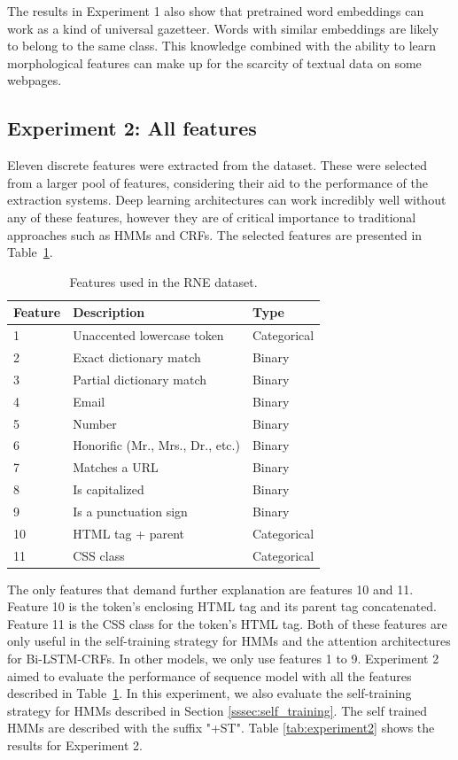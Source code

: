 \documentclass{nle}
\begin{document}
The results in Experiment 1 also show that pretrained word embeddings can work 
as a kind of universal gazetteer. Words with similar embeddings are likely to 
belong to the same class. This knowledge combined with the ability to learn 
morphological features can make up for the scarcity of textual data on some 
webpages.

\subsection{Experiment 2: All features}

Eleven discrete features were extracted from the dataset. 
These were selected from a larger pool of features, 
considering their aid to the performance of the extraction systems. Deep learning 
architectures can work incredibly well without any of these features, however they
are of critical importance to traditional approaches such as HMMs and CRFs. 
The selected features are presented in Table~\ref{tab:features}. 

\begin{table}[h]
  \small
  \begin{center}
    \begin{tabular}{ lll }
      \toprule
      Feature & Description & Type \\
      \midrule
      1  & Unaccented lowercase token & Categorical \\
      2  & Exact dictionary match & Binary \\
      3  & Partial dictionary match & Binary \\
      4  & Email & Binary \\
      5  & Number & Binary \\
      6  & Honorific (Mr., Mrs., Dr., etc.) & Binary \\
      7  & Matches a URL & Binary \\
      8  & Is capitalized & Binary \\
      9  & Is a punctuation sign & Binary \\
      10 & HTML tag + parent & Categorical \\
      11 & CSS class & Categorical \\
      \bottomrule
    \end{tabular}
  \end{center}
  \caption{Features used in the RNE dataset.}
  \label{tab:features}
\end{table}

The only features that demand further explanation are features 10 and 11.
Feature 10 is the token's enclosing HTML tag and its parent tag concatenated.
Feature 11 is the CSS class for the token's HTML tag.
Both of these features are only useful in the self-training strategy for HMMs and the
attention architectures for Bi-LSTM-CRFs. In other models, we only use features 1 to 9.
Experiment 2 aimed to evaluate the performance of sequence model with all
the features described in Table~\ref{tab:features}. In this experiment, we
also evaluate the self-training strategy for HMMs described in Section 
\ref{sssec:self_training}. The self trained HMMs are described with the 
suffix "+ST". Table \ref{tab:experiment2} shows the results for Experiment 2.
\end{document}
